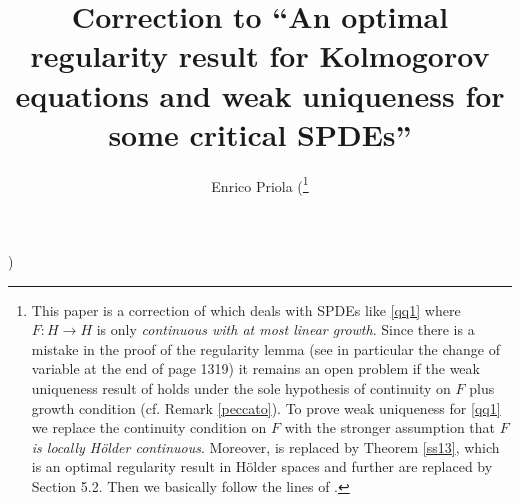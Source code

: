 \documentclass[preprint]{imsart}
\begin{document}
 



\begin{frontmatter}
\title{ Correction to  ``An optimal  regularity result
 for 
Kolmogorov equations  
  and weak uniqueness 
  for  some   critical 
  SPDEs'' } 
\begin{aug}
\author{Enrico Priola  
(\thanks{This paper is a correction of  \cite{priolaAOP}  
 which deals with SPDEs like \eqref{qq1} where $F : H \to H$
  is only {\sl continuous  with at most linear growth}. Since there is a mistake in the proof of the regularity lemma   \cite[Lemma 6]{priolaAOP} (see in particular the change of variable at the end of page 1319)
  it remains an open problem if the weak  uniqueness result of \cite[Theorem 1]{priolaAOP} holds  under the sole hypothesis of continuity  on $F$ plus  growth condition (cf.  Remark \ref{peccato}).  
To prove  weak uniqueness for \eqref{qq1} we replace   the continuity condition on $F$ with the  stronger assumption  that {\sl $F$ is locally H\"older continuous}.  
  Moreover, 
    \cite[Theorem 7]{priolaAOP} is replaced by 
      Theorem \ref{ss13}, which is an optimal regularity result in  H\"older spaces and further  \cite[Sections 5.2 and 5.3]{priolaAOP} are replaced by Section 5.2. Then we basically follow the lines of   \cite{priolaAOP}.  
}}) 


\address{    Dipartimento di  
 Matematica,  
 \\
Universit\`a  di Pavia, Pavia, Italy  
\\
enrico.priola@unipv.it
}


\end{aug}
\end{frontmatter}
\end{document}
